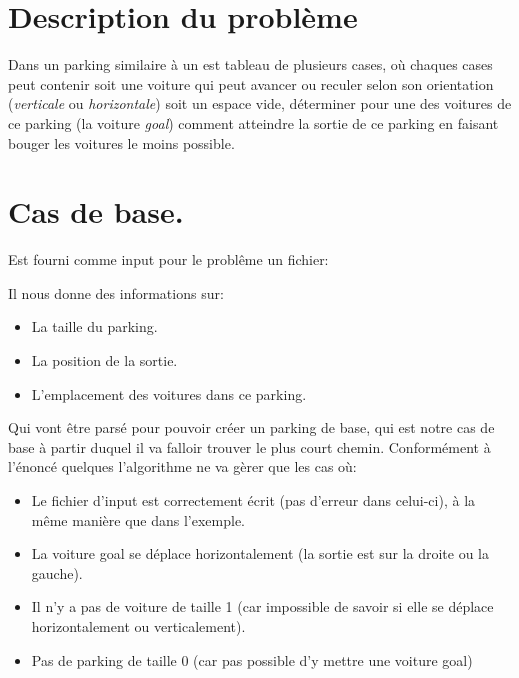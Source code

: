 \documentclass[10pt, a4paper]{article}
\begin{document}
\section{Description du problème}
    Dans un parking similaire à un est tableau de plusieurs cases,
    où chaques cases peut contenir soit une voiture qui peut avancer
    ou reculer selon son orientation (\emph{verticale} ou \emph{horizontale})
    soit un espace vide, déterminer pour une des voitures de ce parking
    (la voiture \emph{goal}) comment atteindre la sortie de ce parking en
    faisant bouger les voitures le moins possible.

\section{Cas de base.}
    Est fourni comme input pour le problême un fichier: \newline
    
    Il nous donne des informations sur:
    \begin{itemize}
        \item La taille du parking.
        \item La position de la sortie.
        \item L'emplacement des voitures dans ce parking.
    \end{itemize}
    Qui vont être parsé pour pouvoir créer un parking de base, qui est notre
    cas de base à partir duquel il va falloir trouver le plus court
    chemin.\newline
    Conformément à l'énoncé quelques l'algorithme ne va gèrer que les cas où:
    \begin{itemize}
        \item Le fichier d'input est correctement écrit (pas d'erreur dans
            celui-ci), à la même manière que dans l'exemple.
        \item La voiture goal se déplace horizontalement (la sortie est sur la
            droite ou la gauche).
        \item Il n'y a pas de voiture de taille 1 (car impossible de savoir si
            elle se déplace horizontalement ou verticalement).
        \item Pas de parking de taille 0 (car pas possible d'y mettre une
            voiture goal)
    \end{itemize}
\end{document}

